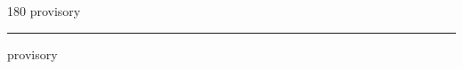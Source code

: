 
\begin{frame}
\begin{center}
\begin{turn}{180}
{\fontsize{2.5cm}{1em}\selectfont provisory}
\end{turn}
\vspace{1em}\par  
\hrule
\vspace{1em}\par  
{\fontsize{2.5cm}{1em}\selectfont provisory}
\end{center}
\end{frame}
